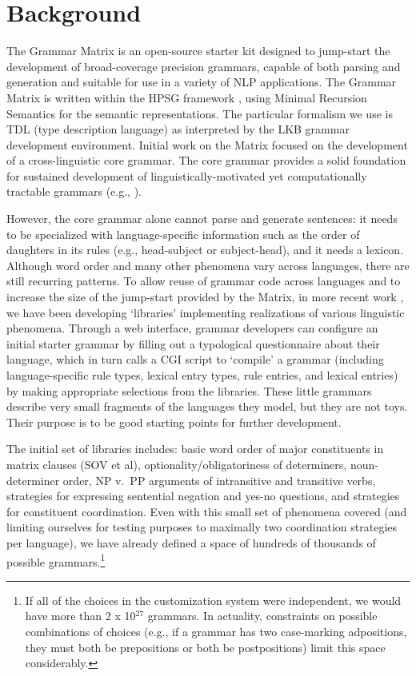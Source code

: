 \documentclass[11pt]{article}
\begin{document}
\section{Background}
\label{GM}

The Grammar Matrix is an open-source starter kit designed to
jump-start the development of broad-coverage precision grammars,
capable of both parsing and generation and suitable for use in a
variety of NLP applications.  The Grammar Matrix is written within the
HPSG framework \cite{Pol:Sag:94}, using Minimal
Recursion Semantics \cite{Cop:Fli:Pol:Sag:05} for the semantic
representations. The particular formalism we use is TDL
(type description language) as interpreted by the LKB
\cite{Copestake02} grammar development environment.  Initial work on
the Matrix \cite{Ben:Fli:Oep:02,Fli:Ben:03} focused on the
development of a cross-linguistic core grammar.  The core grammar
provides a solid foundation for sustained development of
linguistically-motivated yet computationally tractable grammars (e.g.,
\cite{Hel:Hau:03,Kor:Neu:05}).  

However, the core grammar alone cannot parse and generate sentences:
it needs to be specialized with language-specific information such as
the order of daughters in its rules (e.g., head-subject or
subject-head), and it needs a lexicon.  Although word order and many
other phenomena vary across languages, there are still recurring
patterns.  To allow reuse of grammar code across languages and to
increase the size of the jump-start provided by the Matrix, in more
recent work \cite{Ben:Fli:05,Dre:Ben:05}, we have been developing
`libraries' implementing realizations of various linguistic phenomena.
Through a web interface, grammar developers can configure an initial
starter grammar by filling out a typological questionnaire about their
language, which in turn calls a CGI script to `compile' a grammar
(including language-specific rule types, lexical entry types, rule
entries, and lexical entries) by making appropriate selections from
the libraries. These little grammars describe very small fragments of
the languages they model, but they are not toys.  Their purpose is to
be good starting points for further development.

The initial set of libraries includes: basic word order of major
constituents in matrix clauses (SOV et al), optionality/obligatoriness
of determiners, noun-determiner order, NP v.\ PP arguments of
intransitive and transitive verbs, strategies for expressing
sentential negation and yes-no questions, and strategies for
constituent coordination.  Even with this small set of phenomena
covered (and limiting ourselves for testing purposes to 
maximally two coordination strategies per language), we have already
defined a space of hundreds of thousands of possible
grammars.\footnote{If all of the choices in the customization system
were independent, we would have more than 2 x 10$^{27}$ grammars.  In
actuality, constraints on possible combinations of choices (e.g., if a
grammar has two case-marking adpositions, they must both be
prepositions or both be postpositions) limit this space considerably.}
\end{document}
